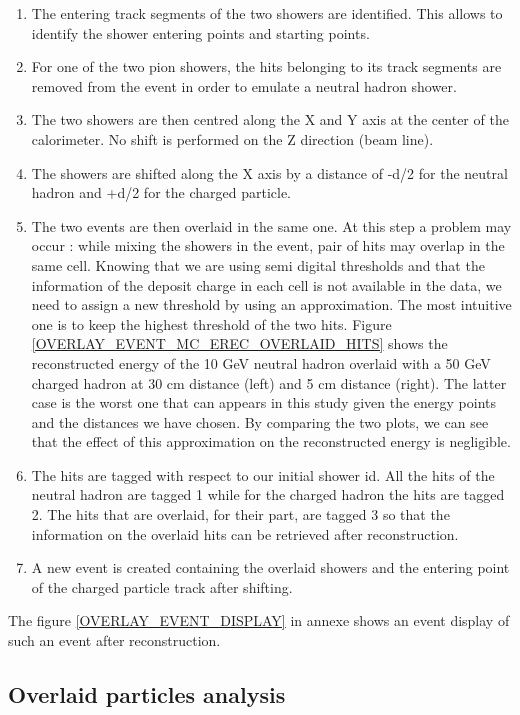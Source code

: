 \documentclass[cits]{JINST}
\begin{document}
\begin{enumerate}
  \item The entering track segments of the two showers are identified. This allows to identify the shower entering points and starting points.
  \item For one of the two pion showers, the hits belonging to its track segments are removed from the event in order to emulate a neutral hadron shower.
  \item The two showers are then centred along the X and Y axis at the center of the calorimeter. No shift is performed on the Z direction (beam line).
  \item The showers are shifted along the X axis by a distance of -d/2 for the neutral hadron and +d/2 for the charged particle.
  \item The two events are then overlaid in the same one. At this step a problem may occur : while mixing the showers in the event, pair of hits may overlap in the same cell. Knowing that we are using semi digital thresholds and that the information of the deposit charge in each cell is not available in the data, we need to assign a new threshold by using an approximation. The most intuitive one is to keep the highest threshold of the two hits. Figure \ref{OVERLAY_EVENT_MC_EREC_OVERLAID_HITS} shows the reconstructed energy of the 10 GeV neutral hadron overlaid with a 50 GeV charged hadron at 30 cm distance (left) and 5 cm distance (right). The latter case is the worst one that can appears in this study given the energy points and the distances we have chosen. By comparing the two plots, we can see that the effect of this approximation on the reconstructed energy is negligible.
  \item The hits are tagged with respect to our initial shower id. All the hits of the neutral hadron are tagged 1 while for the charged hadron the hits are tagged 2. The hits that are overlaid, for their part, are tagged 3 so that the information on the overlaid hits can be retrieved after reconstruction.
  \item A new event is created containing the overlaid showers and the entering point of the charged particle track after shifting.
\end{enumerate}

The figure \ref{OVERLAY_EVENT_DISPLAY} in annexe shows an event display of such an event after reconstruction.

\subsection{Overlaid particles analysis}
\end{document}
